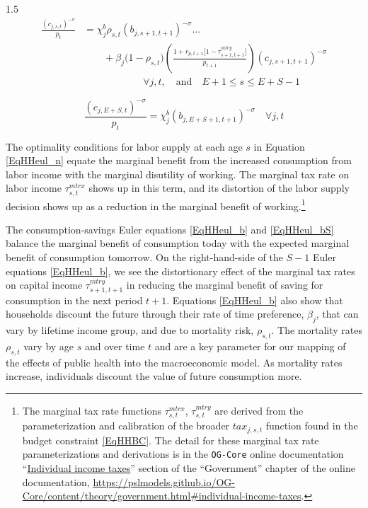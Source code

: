 \documentclass[letterpaper,12pt]{article}
\theoremstyle{definition}
\begin{document}
\begin{spacing}{1.5}
    \begin{equation}\label{EqHHeul_b}
      \begin{split}
        \frac{(c_{j,s,t})^{-\sigma}}{p_t} &= \chi^b_j\rho_{s,t}(b_{j,s+1,t+1})^{-\sigma} ... \\
        &\qquad+ \beta_j\bigl(1 - \rho_{s,t}\bigr)\left(\frac{1 + r_{p,t+1}\bigl[1 - \tau^{mtry}_{s+1,t+1}\bigr]}{p_{t+1}}\right)(c_{j,s+1,t+1})^{-\sigma} \\
        &\qquad\qquad\qquad \forall j,t, \quad\text{and}\quad E+1\leq s\leq E+S-1
      \end{split}
    \end{equation}

    \begin{equation}\label{EqHHeul_bS}
      \frac{(c_{j,E+S,t})^{-\sigma}}{p_t} = \chi^b_j(b_{j,E+S+1,t+1})^{-\sigma} \quad\forall j,t
    \end{equation}

    The optimality conditions for labor supply at each age $s$ in Equation \eqref{EqHHeul_n} equate the marginal benefit from the increased consumption from labor income with the marginal disutility of working. The marginal tax rate on labor income $\tau^{mtrx}_{s,t}$ shows up in this term, and its distortion of the labor supply decision shows up as a reduction in the marginal benefit of working.\footnote{The marginal tax rate functions $\tau^{mtrx}_{s,t}$, $\tau^{mtry}_{s,t}$ are derived from the parameterization and calibration of the broader $tax_{j,s,t}$ function found in the budget constraint \eqref{EqHHBC}. The detail for these marginal tax rate parameterizations and derivations is in the \texttt{OG-Core} online documentation ``\href{https://pslmodels.github.io/OG-Core/content/theory/government.html\#individual-income-taxes}{Individual income taxes}'' section of the ``Government'' chapter of the online documentation, \href{https://pslmodels.github.io/OG-Core/content/theory/government.html\#individual-income-taxes}{https://pslmodels.github.io/OG-Core/content/theory/government.html\#individual-income-taxes}.}

    The consumption-savings Euler equations \eqref{EqHHeul_b} and \eqref{EqHHeul_bS} balance the marginal benefit of consumption today with the expected marginal benefit of consumption tomorrow. On the right-hand-side of the $S-1$ Euler equations \eqref{EqHHeul_b}, we see the distortionary effect of the marginal tax rates on capital income $\tau^{mtry}_{s+1,t+1}$ in reducing the marginal benefit of saving for consumption in the next period $t+1$. Equations \eqref{EqHHeul_b} also show that households discount the future through their rate of time preference, $\beta_j$, that can vary by lifetime income group, and due to mortality risk, $\rho_{s,t}$. The mortality rates $\rho_{s,t}$ vary by age $s$ and over time $t$ and are a key parameter for our mapping of the effects of public health into the macroeconomic model. As mortality rates increase, individuals discount the value of future consumption more.


\end{spacing}
\end{document}
